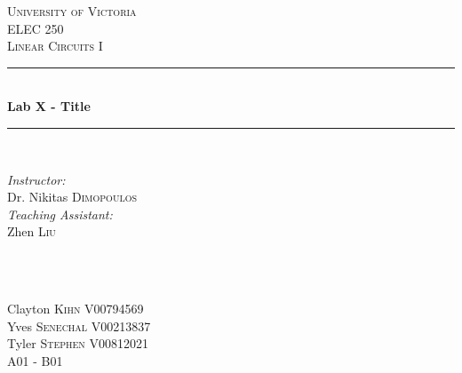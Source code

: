 \documentclass[12pt]{article}
\newcommand{\HRule}{\rule{\linewidth}{0.5mm}}
\begin{document}

\begin{titlepage}

\center
 
\textsc{\LARGE University of Victoria}\\[1cm] 	%
\textsc{\Large ELEC 250}\\[0.5cm] 			%
\textsc{\large Linear Circuits I}\\[0.5cm] 		%


\HRule \\[0.4cm]
{ \huge \bfseries Lab X - Title}\\[0.2cm] %
\HRule \\[1.5cm]
 
 
\begin{minipage}{0.7\textwidth}
\begin{flushleft} 

\large\emph{Instructor:} \\
Dr. Nikitas \textsc{Dimopoulos} \\
\vspace{12 pt}
\emph{Teaching Assistant:} \\
Zhen \textsc{Liu}

\end{flushleft}
\end{minipage}
~
\begin{minipage}{0.1\textwidth}
\begin{flushright} \large
\vspace{12 pt}
\end{flushright}
\end{minipage}\\[2cm]


\Large Clayton \textsc{Kihn}
\large V00794569	\\
\Large Yves \textsc{Senechal}
\large V00213837	\\
\Large Tyler \textsc{Stephen}
\large V00812021	\\
A01 - B01\\[1.5cm] 



\end{titlepage}
\end{document}
